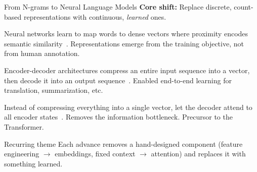 \begin{frame}{From N-grams to Neural Language Models}
  \textbf{Core shift:} Replace discrete, count-based representations with continuous, \emph{learned} ones.

  \begin{description}[style=nextline]
    \item[Learned word embeddings (2003--2014)] Neural networks learn to map words to dense vectors where proximity encodes semantic similarity~\cite{bengio2003neural, mikolov2013word2vec, pennington2014glove}.
      Representations emerge from the training objective, not from human annotation.
    \item[Sequence-to-sequence (2014)] Encoder-decoder architectures compress an entire input sequence into a vector, then decode it into an output sequence~\cite{sutskever2014seq2seq}. Enabled end-to-end learning for translation, summarization, etc.
    \item[Attention (2015)] Instead of compressing everything into a single vector, let the decoder attend to all encoder states~\cite{bahdanau2015attention}. Removes the information bottleneck. Precursor to the Transformer.
  \end{description}

  \begin{alertblock}{Recurring theme}
    Each advance removes a hand-designed component (feature engineering $\to$ embeddings, fixed context $\to$ attention) and replaces it with something learned.
  \end{alertblock}
\end{frame}


